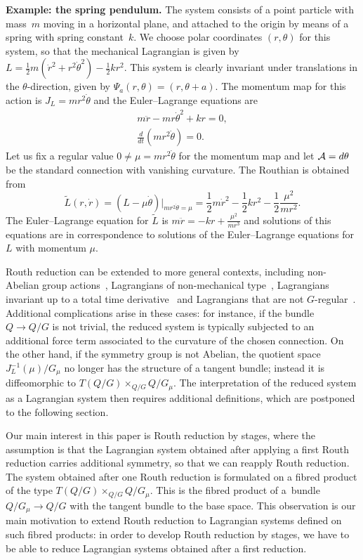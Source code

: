 \documentclass[11pt]{article}
\newcommand{\A}{{\cal A}}
\begin{document}
{\bf Example: the spring pendulum.} The system consists of a point particle with mass~$m$ moving in a horizontal plane, and attached to the origin by means of a spring with spring constant~$k$.  We choose polar coordinates $(r,\theta)$ for this system, so that the mechanical Lagrangian is given by $L = \frac12 m (\dot r^2+ r^2\dot\theta^2)  - \frac12 k r^2$.  This system is clearly invariant under translations in the $\theta$-direction, given by  $\Psi_{a}(r,\theta) = (r,\theta+a)$. The momentum map for this action is $J_L=mr^2\dot\theta$ and the Euler--Lagrange equations are
\begin{gather*} m\ddot r - mr\dot\theta^2+kr =0,\\
\frac{d}{dt} (mr^2\dot\theta)= 0.
\end{gather*}
Let us f\/ix a regular value $0\neq\mu=mr^2\dot\theta$ for the momentum map and let $\A = d\theta$ be the standard connection with vanishing curvature. The Routhian is obtained from \[\tilde L(r,\dot r)=(L-\mu\dot\theta)|_{mr^2\dot\theta=\mu} = \frac12 m\dot r^2 -\frac12 k r^2 - \frac12\frac{\mu^2}{mr^2}.\]
The Euler--Lagrange equation for $\tilde L$ is $m\ddot r =- kr + \frac{\mu^2}{mr^3}$ and solutions of this equations are in correspondence to solutions of the Euler--Lagrange equations for $L$ with momentum $\mu$.


Routh reduction can be extended to more general contexts, including non-Abelian group actions~\cite{marsdenrouth},  Lagrangians of non-mechanical type~\cite{adamec,mestcram},   Lagrangians invariant up to a total time derivative~\cite{BC} and  Lagrangians that are not $G$-regular~\cite{BM}.  Additional complications arise in these cases: for instance, if the bundle $Q\to Q/G$ is not trivial, the reduced system is typically subjected to an additional force term associated to the curvature of the chosen connection. On the other hand, if the symmetry group is not Abelian, the quotient space $J^{-1}_L(\mu)/G_\mu$ no longer has the structure of a tangent bundle; instead it is dif\/feomorphic to $T(Q/G)\times_{Q/G} Q/G_\mu$. The interpretation of the reduced system as a Lagrangian system then requires additional def\/initions, which are postponed to the following section.

Our main interest in this paper is Routh reduction by stages, where the assumption is that the Lagrangian system obtained after applying a f\/irst Routh reduction carries additional symmetry, so that we can reapply Routh reduction. The system obtained after one Routh reduction is formulated on a f\/ibred product of the type $T(Q/G)\times_{Q/G} Q/G_\mu$. This is the f\/ibred product of a~bundle $Q/G_\mu \to Q/G$ with the tangent bundle to the base space. This observation is our main motivation to extend Routh reduction to Lagrangian systems def\/ined on such f\/ibred products:  in order to develop Routh reduction by stages, we have to be able to reduce Lagrangian systems obtained after a f\/irst reduction.
\end{document}
